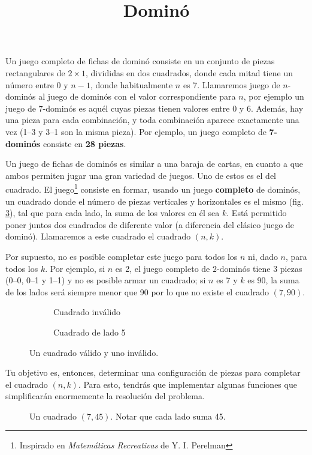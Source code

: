 \documentclass{oci}
\title{Dominó}
\begin{document}
\begin{problemDescription}
Un juego completo de fichas de dominó consiste en un conjunto de piezas rectangulares de $2\times1$, divididas en dos cuadrados, donde cada mitad tiene un número entre 0 y $n-1$, donde habitualmente $n$ es 7.
Llamaremos juego de $n$-dominós al juego de dominós con el valor correspondiente para $n$, por ejemplo un juego de $7$-dominós es aquél cuyas piezas tienen valores entre 0 y 6.
Además, hay una pieza para cada combinación, y toda combinación aparece exactamente una vez (1--3 y 3--1 son la misma pieza).
Por ejemplo, un juego completo de \textbf{7-dominós} consiste en \textbf{28 piezas}.

Un juego de fichas de dominós es similar a una baraja de cartas, en cuanto a que ambos permiten jugar una gran variedad de juegos.
Uno de estos es el del cuadrado.
El juego\footnote{Inspirado en \emph{Matemáticas Recreativas} de Y. I. Perelman} consiste en formar, usando un juego \textbf{completo} de dominós, un cuadrado donde el número de piezas verticales y horizontales es el mismo (fig. \ref{f:cuadrados}), tal que para cada lado, la suma de los valores en él sea $k$.
Está permitido poner juntos dos cuadrados de diferente valor (a diferencia del clásico juego de dominó).
Llamaremos a este cuadrado el cuadrado $(n,k)$.

Por supuesto, no es posible completar este juego para todos los $n$ ni, dado $n$, para todos los $k$.
Por ejemplo, si $n$ es 2, el juego completo de $2$-dominós tiene 3 piezas (0--0, 0--1 y 1--1) y no es posible armar un cuadrado; si $n$ es 7 y $k$ es 90, la suma de los lados será siempre menor que 90 por lo que no existe el cuadrado $(7,90)$.

\begin{figure}[!h]
 \centering
 \begin{subfigure}[b]{0.45\textwidth}
  \centering
  
  \caption{Cuadrado inválido}
  \label{f:invalido}
 \end{subfigure}
 \begin{subfigure}[b]{0.45\textwidth}
  \centering
  
  \caption{Cuadrado de lado 5}
  \label{f:valido}
 \end{subfigure}
 \caption{Un cuadrado válido y uno inválido.}
 \label{f:cuadrados}
\end{figure}

Tu objetivo es, entonces, determinar una configuración de piezas para completar el cuadrado $(n,k)$.
Para esto, tendrás que implementar algunas funciones que simplificarán enormemente la resolución del problema.

\begin{figure}[ht]
 \centering
 
 \caption{Un cuadrado $(7,45)$. Notar que cada lado suma 45.}
 \label{f:cuadrado7}
\end{figure}

\end{problemDescription}
\end{document}
